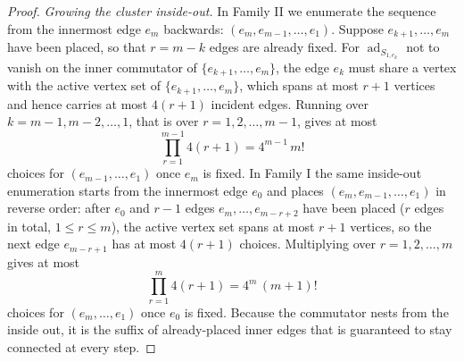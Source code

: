 \documentclass[11pt]{article}
\theoremstyle{plain}
\theoremstyle{definition}
\newcommand{\ad}{\operatorname{ad}}
\begin{document}
\begin{proof}
\emph{Growing the cluster inside-out.} In Family II we enumerate the sequence
from the innermost edge $e_m$ backwards: $(e_m, e_{m-1}, \dots, e_1)$. Suppose
$e_{k+1},\dots,e_m$ have been placed, so that $r=m-k$ edges are already fixed.
For $\ad_{S_{1,e_k}}$ not to vanish on the inner commutator of
$\{e_{k+1},\dots,e_m\}$, the edge $e_k$ must share a vertex with the active
vertex set of $\{e_{k+1},\dots,e_m\}$, which spans at most $r+1$ vertices and
hence carries at most $4(r+1)$ incident edges. Running over
$k=m-1,m-2,\dots,1$, that is over $r=1,2,\dots,m-1$, gives at most
\begin{equation}\label{eq:countII}
\prod_{r=1}^{m-1}4(r+1)=4^{m-1}\,m!
\end{equation}
choices for $(e_{m-1},\dots,e_1)$ once $e_m$ is fixed. In Family I the same
inside-out enumeration starts from the innermost edge $e_0$ and places
$(e_m,e_{m-1},\dots,e_1)$ in reverse order: after $e_0$ and $r-1$ edges
$e_m,\dots,e_{m-r+2}$ have been placed ($r$ edges in total, $1\le r\le m$), the
active vertex set spans at most $r+1$ vertices, so the next edge $e_{m-r+1}$ has
at most $4(r+1)$ choices. Multiplying over $r=1,2,\dots,m$ gives at most
\begin{equation}\label{eq:countI}
\prod_{r=1}^{m}4(r+1)=4^{m}\,(m+1)!
\end{equation}
choices for $(e_m,\dots,e_1)$ once $e_0$ is fixed. Because the commutator nests
from the inside out, it is the suffix of already-placed inner edges that is
guaranteed to stay connected at every step.


\end{proof}
\end{document}
